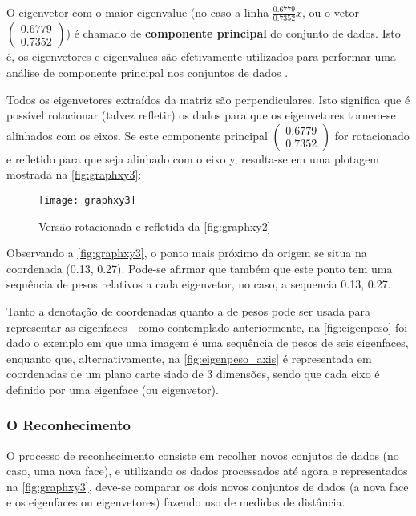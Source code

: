 O eigenvetor com o maior eigenvalue (no caso a linha $\frac{0.6779}{0.7352}$$x$, ou o vetor $\begin{pmatrix} 0.6779 \\ 0.7352 \end{pmatrix}$) é chamado de \textbf{componente principal} do conjunto de dados. Isto é, os eigenvetores e eigenvalues são efetivamente utilizados para performar uma análise de componente principal nos conjuntos de dados \cite{drmathew_java_programming}.

Todos os eigenvetores extraídos da matriz são perpendiculares. Isto significa que é possível rotacionar (talvez refletir) os dados para que os eigenvetores tornem-se alinhados com os eixos. Se este componente principal $\begin{pmatrix} 0.6779 \\ 0.7352 \end{pmatrix}$ for rotacionado e refletido para que seja alinhado com o eixo y, resulta-se em uma plotagem mostrada na \autoref{fig:graphxy3}:

\begin{figure}[h]
	\centering
	\texttt{[image: graphxy3]}
	\caption{Versão rotacionada e refletida da \autoref{fig:graphxy2}}
	\label{fig:graphxy3}
\end{figure}

Observando a \autoref{fig:graphxy3}, o ponto mais próximo da origem se situa na coordenada (0.13, 0.27). Pode-se afirmar que também que este ponto tem uma sequência de pesos relativos a cada eigenvetor, no caso, a sequencia {0.13, 0.27}.

Tanto a denotação de coordenadas quanto a de pesos pode ser usada para representar as eigenfaces - como contemplado anteriormente, na \autoref{fig:eigenpeso} foi dado o exemplo em que uma imagem é uma sequência de pesos de seis eigenfaces, enquanto que, alternativamente, na  \autoref{fig:eigenpeso_axis} é representada em coordenadas de um plano carte siado de 3 dimensões, sendo que cada eixo é definido por uma eigenface (ou eigenvetor).

\subsubsection{O Reconhecimento}\label{subsec:eigenacp}

O processo de reconhecimento consiste em recolher novos conjutos de dados (no caso, uma nova face), e utilizando os dados processados até agora e representados na \autoref{fig:graphxy3}, deve-se comparar os dois novos conjuntos de dados (a nova face e os eigenfaces ou eigenvetores) fazendo uso de medidas de distância. 


